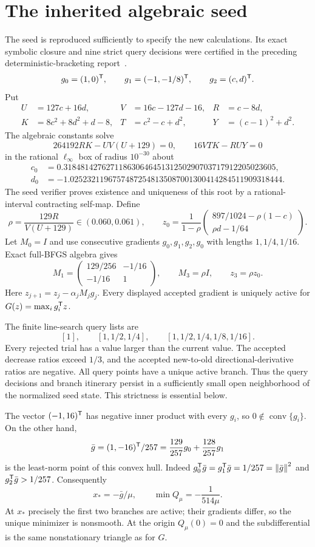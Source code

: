\section{The inherited algebraic seed}
The seed is reproduced sufficiently to specify the new calculations. Its exact symbolic closure and nine strict query decisions were certified in the preceding deterministic-bracketing report~\cite{SD}.
\[
 g_0=(1,0)^{\mathsf T},\qquad g_1=(-1,-1/8)^{\mathsf T},\qquad g_2=(c,d)^{\mathsf T}.
\]
Put
\begin{align*}
 U&=127c+16d,&V&=16c-127d-16,&R&=c-8d,\\
 K&=8c^2+8d^2+d-8,&T&=c^2-c+d^2,&Y&=(c-1)^2+d^2.
\end{align*}
The algebraic constants solve
\[
 264192RK-UV(U+129)=0,\qquad 16VTK-RUY=0
\]
in the rational $\ell_\infty$ box of radius $10^{-30}$ about
\begin{align*}
 c_0&=0.31848142762711863064645131250290703717912205023605,\\
 d_0&=-1.02523211967574872548135087001300414284511909318444.
\end{align*}
The seed verifier proves existence and uniqueness of this root by a rational-interval contracting self-map. Define
\[
 \rho=\frac{129R}{V(U+129)}\in(0.060,0.061),\qquad
 z_0=\frac1{1-\rho}
 \begin{pmatrix}897/1024-\rho(1-c)\\ \rho d-1/64\end{pmatrix}.
\]
Let $M_0=I$ and use consecutive gradients $g_0,g_1,g_2,g_0$ with lengths $1,1/4,1/16$. Exact full-BFGS algebra gives
\[
 M_1=\begin{pmatrix}129/256&-1/16\\-1/16&1\end{pmatrix},
 \qquad M_3=\rho I,\qquad z_3=\rho z_0.
\]
Here $z_{j+1}=z_j-\alpha_jM_jg_j$. Every displayed accepted gradient is uniquely active for $G(z)=\max_i g_i^{\mathsf T} z$.

The finite line-search query lists are
\[
 [1],\qquad[1,1/2,1/4],\qquad[1,1/2,1/4,1/8,1/16].
\]
Every rejected trial has a value larger than the current value. The accepted decrease ratios exceed $1/3$, and the accepted new-to-old directional-derivative ratios are negative. All query points have a unique active branch. Thus the query decisions and branch itinerary persist in a sufficiently small open neighborhood of the normalized seed state. This strictness is essential below.

The vector $(-1,16)^{\mathsf T}$ has negative inner product with every $g_i$, so $0\notin\operatorname{conv}\{g_i\}$. On the other hand,
\[
 \bar g=(1,-16)^{\mathsf T}/257
 =\frac{129}{257}g_0+\frac{128}{257}g_1
\]
is the least-norm point of this convex hull. Indeed $g_0^{\mathsf T}\bar g=g_1^{\mathsf T}\bar g=1/257=\left\lVert\bar g\right\rVert^2$ and $g_2^{\mathsf T}\bar g>1/257$. Consequently
\begin{equation}\label{L:eq:minimizer}
 x_*=-\bar g/\mu,\qquad \min Q_\mu=-\frac1{514\mu}.
\end{equation}
At $x_*$ precisely the first two branches are active; their gradients differ, so the unique minimizer is nonsmooth. At the origin $Q_\mu(0)=0$ and the subdifferential is the same nonstationary triangle as for $G$.



